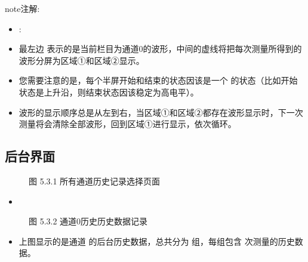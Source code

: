 \documentclass[a4paper,10pt,english]{sphinxmanual}
\begin{document}
\begin{sphinxadmonition}{note}{注解:}\begin{itemize}
\item {} 
\sphinxAtStartPar
{} :

\item {} 
\sphinxAtStartPar
最左边  表示的是当前栏目为通道0的波形，中间的虚线将把每次测量所得到的波形分屏为区域①和区域②显示。

\item {} 
\sphinxAtStartPar
您需要注意的是，每个半屏开始和结束的状态因该是一个  的状态（比如开始状态是上升沿，则结束状态因该稳定为高电平）。

\item {} 
\sphinxAtStartPar
波形的显示顺序总是从左到右，当区域①和区域②都存在波形显示时，下一次测量将会清除全部波形，回到区域①进行显示，依次循环。

\end{itemize}
\end{sphinxadmonition}


\subsection{后台界面}
\label{\detokenize{operation_guide:id4}}
\begin{figure}[htbp]
\centering
\capstart

\noindent{}
\caption{图 5.3.1 所有通道历史记录选择页面}\label{\detokenize{operation_guide:id14}}\end{figure}
\begin{itemize}
\item {} 
\sphinxAtStartPar
{}

\end{itemize}

\begin{figure}[htbp]
\centering
\capstart

\noindent{}
\caption{图 5.3.2 通道0历史历史数据记录}\label{\detokenize{operation_guide:id15}}\end{figure}
\begin{itemize}
\item {} 
\sphinxAtStartPar
上图显示的是通道  的后台历史数据，总共分为  组，每组包含  次测量的历史数据。

\end{itemize}
\end{document}
